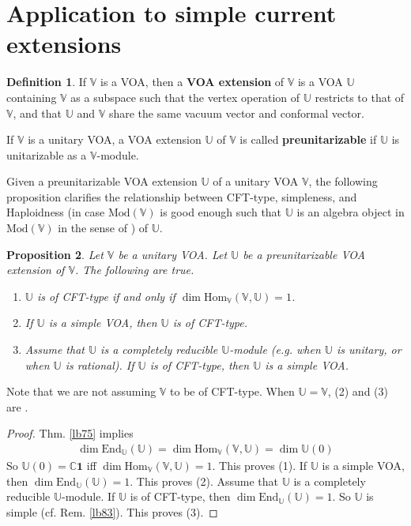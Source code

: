 \documentclass[11pt,b5paper,notitlepage]{article}
\theoremstyle{definition}
\newtheorem{df}{Definition}[section]
\theoremstyle{plain}
\newtheorem{pp}[df]{Proposition}
\newcommand{\End}{\mathrm{End}} %
\newcommand{\id}{\mathbf{1}}
\newcommand{\Hom}{\mathrm{Hom}}
\newcommand{\Vbb}{\mathbb V}
\newcommand{\Ubb}{\mathbb U}
\newcommand{\Cbb}{\mathbb C}
\newcommand{\Mod}{\mathrm{Mod}}
\numberwithin{equation}{section}
\begin{document}
\section{Application to simple current extensions}

\begin{df}
If $\Vbb$ is a VOA, then a \textbf{VOA extension} of $\Vbb$ is a VOA $\Ubb$ containing $\Vbb$ as a subspace such that the vertex operation of $\Ubb$ restricts to that of $\Vbb$, and that $\Ubb$ and $\Vbb$ share the same vacuum vector and conformal vector. 

If $\Vbb$ is a unitary VOA, a VOA extension $\Ubb$ of $\Vbb$ is called \textbf{preunitarizable} if $\Ubb$ is unitarizable as a $\Vbb$-module.  \hfill\qedsymbol
\end{df}


Given a preunitarizable VOA extension $\Ubb$ of a unitary VOA $\Vbb$, the following proposition clarifies the relationship between CFT-type, simpleness, and Haploidness (in case $\Mod(\Vbb)$ is good enough such that $\Ubb$ is an algebra object in $\Mod(\Vbb)$ in the sense of \cite{KO02,CKM17}) of $\Ubb$.



\begin{pp}\label{lb79}
Let $\Vbb$ be a unitary VOA. Let $\Ubb$ be a preunitarizable VOA extension of $\Vbb$. The following are true.
\begin{enumerate}[label=(\arabic*)]
\item $\Ubb$ is of CFT-type if and only if $\dim\Hom_\Vbb(\Vbb,\Ubb)=1$.
\item If $\Ubb$ is a simple VOA, then $\Ubb$ is of CFT-type. 
\item Assume that $\Ubb$ is a completely reducible $\Ubb$-module (e.g. when $\Ubb$ is unitary, or when $\Ubb$ is rational). If $\Ubb$ is of CFT-type, then $\Ubb$ is a simple VOA.
\end{enumerate}
\end{pp}

Note that we are not assuming $\Vbb$ to be of CFT-type. When $\Ubb=\Vbb$, (2) and (3) are \cite[Prop. 5.3]{CKLW18}.

\begin{proof}
Thm. \ref{lb75} implies
\begin{align}
\dim\End_\Ubb(\Ubb)=\dim\Hom_\Vbb(\Vbb,\Ubb)=\dim\Ubb(0)
\end{align}
So $\Ubb(0)=\Cbb\id$ iff $\dim\Hom_\Vbb(\Vbb,\Ubb)=1$. This proves (1). If $\Ubb$ is a simple VOA, then $\dim\End_\Ubb(\Ubb)=1$. This proves (2). Assume that $\Ubb$ is a completely reducible $\Ubb$-module. If $\Ubb$ is of CFT-type, then $\dim\End_\Ubb(\Ubb)=1$. So $\Ubb$ is simple (cf. Rem. \ref{lb83}). This proves (3).
\end{proof}
\end{document}

